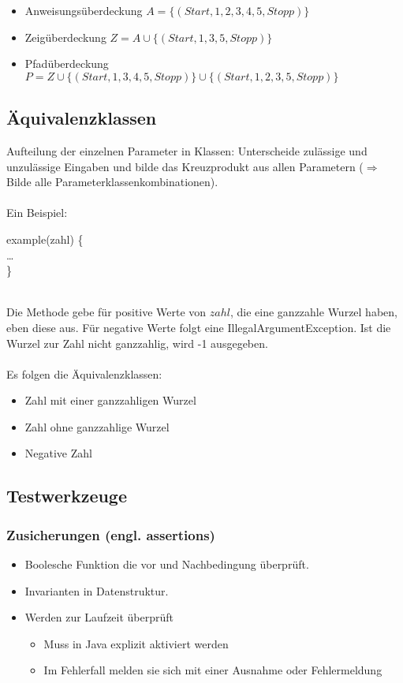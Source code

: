 \begin{itemize}
    \item Anweisungsüberdeckung
    $A = \{(Start,1,2,3,4,5,Stopp)\}$
    \item Zeigüberdeckung
    $Z = A \cup \{(Start,1,3,5,Stopp)\}$
    \item Pfadüberdeckung
    $P = Z \cup \{(Start,1,3,4,5,Stopp)\} \cup \{(Start,1,2,3,5, Stopp)\}$
\end{itemize}

\subsection{Äquivalenzklassen}
Aufteilung der einzelnen Parameter in Klassen: Unterscheide zulässige und unzulässige Eingaben und bilde das Kreuzprodukt aus allen Parametern ($\Rightarrow$ Bilde alle Parameterklassenkombinationen).
\\\\
Ein Beispiel:
\\
\begin{code}
    \javaPublic \javaInt example(\javaInt zahl) \{\\
    \quad\dots\ \\\}
\end{code}
\\
Die Methode gebe für positive Werte von $zahl$, die eine ganzzahle Wurzel haben, eben diese aus. Für negative Werte folgt eine IllegalArgumentException. Ist die Wurzel zur Zahl nicht ganzzahlig, wird -1 ausgegeben.
\\
\\
Es folgen die Äquivalenzklassen:
\begin{itemize}
    \item Zahl mit einer ganzzahligen Wurzel
    \item Zahl ohne ganzzahlige Wurzel
    \item Negative Zahl
\end{itemize}

\subsection{Testwerkzeuge}
\subsubsection{Zusicherungen (engl. assertions)}
\begin{itemize}
    \item Boolesche Funktion die vor und Nachbedingung überprüft.
    \item Invarianten in Datenstruktur.
    \item Werden zur Laufzeit überprüft
    \begin{itemize}
        \item Muss in Java explizit aktiviert werden
        \item Im Fehlerfall melden sie sich mit einer Ausnahme oder Fehlermeldung
    \end{itemize}
\end{itemize}


